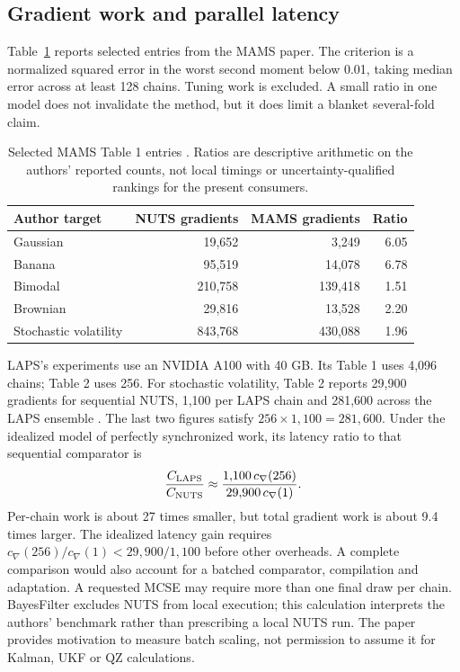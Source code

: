 \subsection{Gradient work and parallel latency}

Table~\ref{tab:bf-modern-mams-benchmarks} reports selected entries from the
MAMS paper. The criterion is a normalized squared error in the worst second
moment below 0.01, taking median error across at least 128 chains. Tuning work
is excluded. A small ratio in one model does not invalidate the method, but
it does limit a blanket several-fold claim.
\begin{table}[htbp]
\centering\small
\begin{tabular}{lrrr}
\toprule
Author target & NUTS gradients & MAMS gradients & Ratio\\
\midrule
Gaussian & 19,652 & 3,249 & 6.05\\
Banana & 95,519 & 14,078 & 6.78\\
Bimodal & 210,758 & 139,418 & 1.51\\
Brownian & 29,816 & 13,528 & 2.20\\
Stochastic volatility & 843,768 & 430,088 & 1.96\\
\bottomrule
\end{tabular}
\caption{Selected MAMS Table 1 entries \citep{robnik2025mams}. Ratios are
descriptive arithmetic on the authors' reported counts, not local timings
or uncertainty-qualified rankings for the present consumers.}
\label{tab:bf-modern-mams-benchmarks}
\end{table}

LAPS's experiments use an NVIDIA A100 with 40 GB. Its Table 1 uses 4,096
chains; Table 2 uses 256. For stochastic volatility, Table 2 reports 29,900
gradients for sequential NUTS, 1,100 per LAPS chain and 281,600 across the
LAPS ensemble \citep{robnik2026laps}. The last two figures satisfy
$256\times1{,}100=281{,}600$. Under the idealized model of perfectly
synchronized work, its latency ratio to that sequential comparator is
\begin{equation}
 \frac{C_{\rm LAPS}}{C_{\rm NUTS}}
 \approx\frac{1{,}100\,c_{\nabla}(256)}
              {29{,}900\,c_{\nabla}(1)}.
 \label{eq:bf-modern-laps-work-latency}
\end{equation}
Per-chain work is about 27 times smaller, but total gradient work is about
9.4 times larger. The idealized latency gain requires
$c_{\nabla}(256)/c_{\nabla}(1)<29{,}900/1{,}100$ before other overheads.
A complete comparison would also account for a batched comparator,
compilation and adaptation. A requested MCSE may require more than one final
draw per chain. BayesFilter excludes NUTS from local execution; this calculation
interprets the authors' benchmark rather than prescribing a local NUTS run.
The paper provides motivation to measure batch scaling, not permission to
assume it for Kalman, UKF or QZ calculations.


